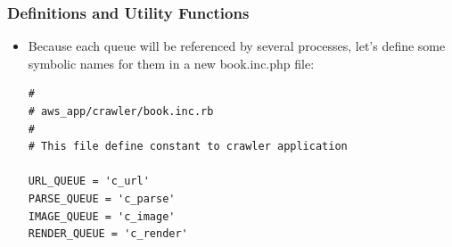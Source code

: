 \documentclass{beamer}
\begin{document}
\begin{frame}
\frametitle{Definitions and Utility Functions}

\lstset{language=Ruby, style=eclipse}

\begin{itemize}
\item Because each queue will be referenced by several processes, let’s define some symbolic names for them in a new  book.inc.php file:

\begin{lstlisting}[escapechar=&]
#
# aws_app/crawler/book.inc.rb
#
# This file define constant to crawler application

URL_QUEUE = 'c_url'
PARSE_QUEUE = 'c_parse'
IMAGE_QUEUE = 'c_image'
RENDER_QUEUE = 'c_render'
\end{lstlisting}

\end{itemize}


\end{frame}
\end{document}
